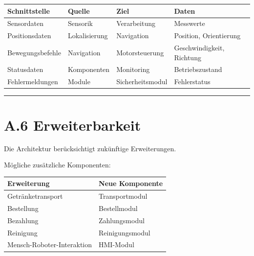 \documentclass[
  a4paper,
  12pt,
  DIV=12,        %
  parskip=half,  %
  headings=small %
]{scrartcl}
\theoremstyle{definition}
\theoremstyle{definition}
\begin{document}
\begin{longtable}[]{@{}
  >{\raggedright\arraybackslash}p{}
  >{\raggedright\arraybackslash}p{}
  >{\raggedright\arraybackslash}p{}
  >{\raggedright\arraybackslash}p{}@{}}
\toprule\noalign{}
\begin{minipage}[b]{\linewidth}\raggedright
Schnittstelle
\end{minipage} & \begin{minipage}[b]{\linewidth}\raggedright
Quelle
\end{minipage} & \begin{minipage}[b]{\linewidth}\raggedright
Ziel
\end{minipage} & \begin{minipage}[b]{\linewidth}\raggedright
Daten
\end{minipage} \\
\midrule\noalign{}
\endhead
\bottomrule\noalign{}
\endlastfoot
Sensordaten & Sensorik & Verarbeitung & Messwerte \\
Positionsdaten & Lokalisierung & Navigation & Position, Orientierung \\
Bewegungsbefehle & Navigation & Motorsteuerung & Geschwindigkeit,
Richtung \\
Statusdaten & Komponenten & Monitoring & Betriebszustand \\
Fehlermeldungen & Module & Sicherheitsmodul & Fehlerstatus \\
\end{longtable}

\begin{center}\rule{0.5\linewidth}{0.5pt}\end{center}

\section{A.6 Erweiterbarkeit}\label{a.6-erweiterbarkeit}

Die Architektur berücksichtigt zukünftige Erweiterungen.

Mögliche zusätzliche Komponenten:

\begin{longtable}[]{@{}ll@{}}
\toprule\noalign{}
Erweiterung & Neue Komponente \\
\midrule\noalign{}
\endhead
\bottomrule\noalign{}
\endlastfoot
Getränketransport & Transportmodul \\
Bestellung & Bestellmodul \\
Bezahlung & Zahlungsmodul \\
Reinigung & Reinigungsmodul \\
Mensch-Roboter-Interaktion & HMI-Modul \\
\end{longtable}
\end{document}
